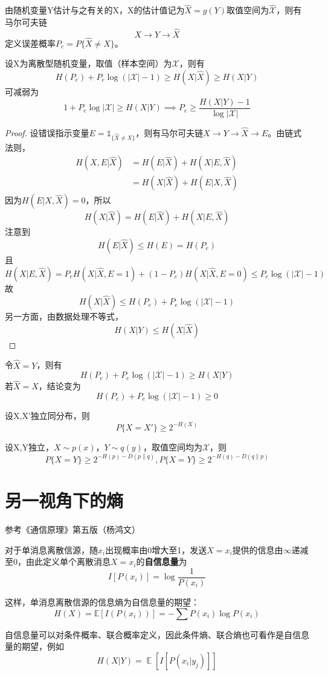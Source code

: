 \documentclass{ctexbook}
\DeclareMathOperator{\E}{\mathbb{E}}     %
\begin{document}
由随机变量Y估计与之有关的X，X的估计值记为$\hat{X}=g(Y)$取值空间为$\hat{\mathcal{X}}$，则有马尔可夫链
$$X \to Y \to \hat{X}$$
定义误差概率$P_e = P\{\hat{X} \neq X\}$。
\begin{theorem}[Fano不等式]
    设X为离散型随机变量，取值（样本空间）为$\mathcal{X}$，则有
    \[H(P_e) + P_e \log (|\mathcal{X}| - 1) \geq H(X|\hat{X})\geq H(X|Y)\]
    可减弱为
    \[1+P_e \log |\mathcal{X}|\geq H(X|Y)\implies P_e \geq \frac{H(X|Y)-1}{\log |\mathcal{X}|}\]
\end{theorem}
\begin{proof}
    设错误指示变量$E=\mathds{1} _{\{\hat{X} \neq X\}}$，则有马尔可夫链$X \to Y \to \hat{X} \to E$。由链式法则，
    \begin{align*}
        H(X,E|\hat{X}) &= H(E|\hat{X}) + H(X|E,\hat{X}) \\
        &= H(X|\hat{X}) + H(E|X,\hat{X})
    \end{align*}
    因为$H(E|X,\hat{X})=0$，所以
    \[H(X|\hat{X}) = H(E|\hat{X}) + H(X|E,\hat{X})\]
    注意到
    \[H(E|\hat{X}) \leq H(E) = H(P_e)\]
    且
    \[H(X|E,\hat{X}) = P_e H(X|\hat{X},E=1) + (1-P_e)H(X|\hat{X},E=0) \leq P_e \log (|\mathcal{X}| - 1)\]
    故
    \[H(X|\hat{X}) \leq H(P_e) + P_e \log (|\mathcal{X}| - 1)\]
    另一方面，由数据处理不等式，
    \[H(X|Y) \leq H(X|\hat{X})\]
\end{proof}
\begin{corollary}
    令$\hat{X}=Y$，则有
    \[H(P_e) + P_e \log (|\mathcal{X}| - 1) \geq H(X|Y)\]
    若$\hat{X}=X$，结论变为
    \[H(P_e) + P_e \log (|\mathcal{X}| - 1) \geq 0\]
\end{corollary}

\begin{proposition}
    设X,X'独立同分布，则
    \[P\{X=X'\}\geq 2^{-H(X)}\]
\end{proposition}
\begin{corollary}
    设X,Y独立，$X\sim p(x)$，$Y\sim q(y)$，取值空间均为$\mathcal{X}$，则
    \[P\{X=Y\}\geq 2^{-H(p)-D(p\|q)},P\{X=Y\}\geq 2^{-H(q)-D(q\|p)}\]
\end{corollary}

\section{另一视角下的熵}

参考《通信原理》第五版（杨鸿文）

\begin{definition}
    对于单消息离散信源，随$x_i$出现概率由0增大至1，发送$X=x_i$提供的信息由$\infty$递减至0，由此定义单个离散消息$X=x_i$的\textbf{自信息量}为
    $$I[P(x_i)]=\log\frac{1}{P(x_i)}$$

    这样，单消息离散信源的信息熵为自信息量的期望：
    $$H(X)=\mathbb{E}[I(P(x_i))]=-\sum P(x_i)\log P(x_i)$$
\end{definition}
自信息量可以对条件概率、联合概率定义，因此条件熵、联合熵也可看作是自信息量的期望，例如
$$H(X|Y)=\E[I[P(x_i|y_j)]]$$
\end{document}
